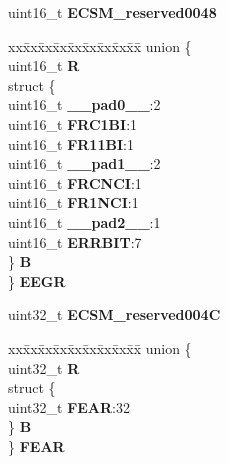 \begin{DoxyCompactItemize}
\begin{tabbing}
\end{tabbing}\item 
\mbox{\label{structECSM__tag_a8e546eafe510f2823f4c5c3bb64a011a}} 
uint16\+\_\+t {\bfseries E\+C\+S\+M\+\_\+reserved0048}
\item 
\mbox{\label{structECSM__tag_a66f512d5a46ea922887aad7a40bd89f6}} 
\begin{tabbing}
xx\=xx\=xx\=xx\=xx\=xx\=xx\=xx\=xx\=\kill
union \{\\
\>uint16\_t {\bfseries R}\\
\>struct \{\\
\>\>uint16\_t {\bfseries \_\_pad0\_\_}:2\\
\>\>uint16\_t {\bfseries FRC1BI}:1\\
\>\>uint16\_t {\bfseries FR11BI}:1\\
\>\>uint16\_t {\bfseries \_\_pad1\_\_}:2\\
\>\>uint16\_t {\bfseries FRCNCI}:1\\
\>\>uint16\_t {\bfseries FR1NCI}:1\\
\>\>uint16\_t {\bfseries \_\_pad2\_\_}:1\\
\>\>uint16\_t {\bfseries ERRBIT}:7\\
\>\} {\bfseries B}\\
\} {\bfseries EEGR}\\

\end{tabbing}\item 
\mbox{\label{structECSM__tag_acdcd70e18976453399b84ba41f3fed34}} 
uint32\+\_\+t {\bfseries E\+C\+S\+M\+\_\+reserved004C}
\item 
\mbox{\label{structECSM__tag_a26714824bc40667d6cb302702837635e}} 
\begin{tabbing}
xx\=xx\=xx\=xx\=xx\=xx\=xx\=xx\=xx\=\kill
union \{\\
\>uint32\_t {\bfseries R}\\
\>struct \{\\
\>\>uint32\_t {\bfseries FEAR}:32\\
\>\} {\bfseries B}\\
\} {\bfseries FEAR}\\


\end{tabbing}
\end{DoxyCompactItemize}
